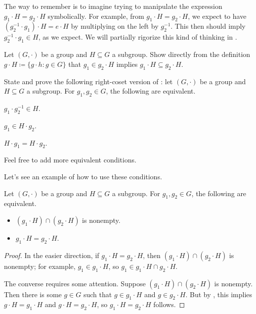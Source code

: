 \documentclass[../main.tex]{subfiles}
\begin{document}
\begin{remark} \label{rem:unjustified-manip}
    The way to remember  is to imagine trying to manipulate the expression $g_1\cdot H=g_2\cdot H$ symbolically. For example, from $g_1\cdot H=g_2\cdot H$, we expect to have $\left(g_2^{-1}\cdot g_1\right)\cdot H=e\cdot H$ by multiplying on the left by $g_2^{-1}$. This then should imply $g_2^{-1}\cdot g_1\in H$, as we expect. We will partially rigorize this kind of thinking in .
\end{remark}
\begin{exe}
    Let $(G,\cdot)$ be a group and $H\subseteq G$ a subgroup. Show directly from the definition $g\cdot H\coloneqq\{g\cdot h:g\in G\}$ that $g_1\in g_2\cdot H$ implies $g_1\cdot H\subseteq g_2\cdot H$.
\end{exe}
\begin{exe} \label{exe:how-to-right-coset}
    State and prove the following right-coset version of : let $(G,\cdot)$ be a group and $H\subseteq G$ a subgroup. For $g_1,g_2\in G$, the following are equivalent.
    \begin{listalph}
        \item $g_1\cdot g_2^{-1}\in H$.
        \item $g_1\in H\cdot g_2$.
        \item $H\cdot g_1=H\cdot g_2$.
    \end{listalph}
    Feel free to add more equivalent conditions.
\end{exe}
Let's see an example of how to use these conditions.
\begin{corollary} \label{cor:intersect-cosets}
    Let $(G,\cdot)$ be a group and $H\subseteq G$ a subgroup. For $g_1,g_2\in G$, the following are equivalent.
    \begin{itemize}
        \item $(g_1\cdot H)\cap(g_2\cdot H)$ is nonempty.
        \item $g_1\cdot H=g_2\cdot H$.
    \end{itemize}
\end{corollary}
\begin{proof}
    In the easier direction, if $g_1\cdot H=g_2\cdot H$, then $(g_1\cdot H)\cap(g_2\cdot H)$ is nonempty; for example, $g_1\in g_1\cdot H$, so $g_1\in g_1\cdot H\cap g_2\cdot H$.
    
    The converse requires some attention. Suppose $(g_1\cdot H)\cap (g_2\cdot H)$ is nonempty. Then there is some $g\in G$ such that $g\in g_1\cdot H$ and $g\in g_2\cdot H$. But by , this implies $g\cdot H=g_1\cdot H$ and $g\cdot H=g_2\cdot H$, so $g_1\cdot H=g_2\cdot H$ follows.
\end{proof}
\end{document}
